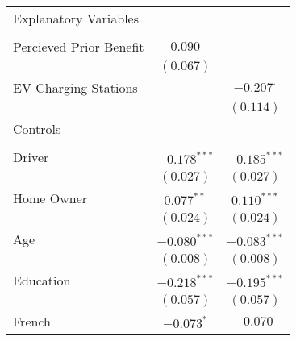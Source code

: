 \begin{center}
\begin{tiny}
\begin{longtable}{l@{} c@{} c@{}}
Explanatory Variables                                                       &                  &                  \\
                                                                            &                  &                  \\
\quad Percieved Prior Benefit                                               & $0.090$          &                  \\
                                                                            & $(0.067)$        &                  \\
\quad EV Charging Stations                                                  &                  & $-0.207^{\cdot}$ \\
                                                                            &                  & $(0.114)$        \\
Controls                                                                    &                  &                  \\
                                                                            &                  &                  \\
\quad Driver                                                                & $-0.178^{***}$   & $-0.185^{***}$   \\
                                                                            & $(0.027)$        & $(0.027)$        \\
\quad Home Owner                                                            & $0.077^{**}$     & $0.110^{***}$    \\
                                                                            & $(0.024)$        & $(0.024)$        \\
\quad Age                                                                   & $-0.080^{***}$   & $-0.083^{***}$   \\
                                                                            & $(0.008)$        & $(0.008)$        \\
\quad Education                                                             & $-0.218^{***}$   & $-0.195^{***}$   \\
                                                                            & $(0.057)$        & $(0.057)$        \\
\quad French                                                                & $-0.073^{*}$     & $-0.070^{\cdot}$ \\

\end{longtable}
\end{tiny}
\end{center}
